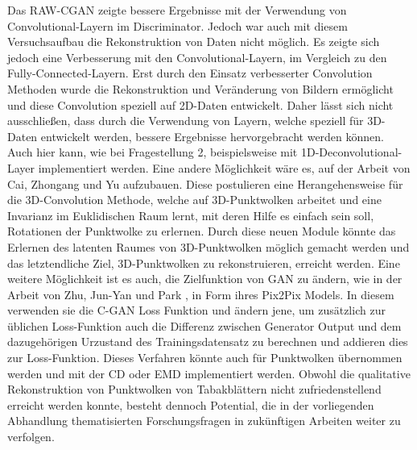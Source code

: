 \documentclass{llncs}
\begin{document}
\pagebreak\linebreak 
Das RAW-CGAN zeigte bessere Ergebnisse mit der Verwendung von Convolutional-Layern im Discriminator. Jedoch war auch mit diesem Versuchsaufbau die Rekonstruktion von Daten nicht möglich. Es zeigte sich jedoch eine Verbesserung mit den Convolutional-Layern, im Vergleich zu den Fully-Connected-Layern. Erst durch den Einsatz verbesserter Convolution Methoden wurde die Rekonstruktion und Veränderung von Bildern ermöglicht  \cite{imagerecon} und diese Convolution speziell auf 2D-Daten entwickelt. Daher lässt sich nicht ausschließen, dass durch die Verwendung von Layern, welche speziell für 3D-Daten entwickelt werden, bessere Ergebnisse hervorgebracht werden können. Auch hier kann, wie bei Fragestellung 2, beispielsweise mit 1D-Deconvolutional-Layer implementiert werden. Eine andere Möglichkeit wäre es, auf der Arbeit von Cai, Zhongang  und Yu \cite{3d-conv} aufzubauen. Diese postulieren eine Herangehensweise für die 3D-Convolution Methode, welche auf 3D-Punktwolken arbeitet und eine Invarianz im Euklidischen Raum lernt, mit deren Hilfe es einfach sein soll, Rotationen der Punktwolke zu erlernen. Durch diese neuen Module könnte das Erlernen des latenten Raumes von 3D-Punktwolken möglich gemacht werden und das letztendliche Ziel, 3D-Punktwolken zu rekonstruieren, erreicht werden.  Eine weitere Möglichkeit ist es auch, die Zielfunktion von GAN zu ändern, wie in der Arbeit von Zhu, Jun-Yan und Park \cite{pix2pix}, in Form ihres Pix2Pix Models. In diesem verwenden sie die C-GAN Loss Funktion und ändern jene, um zusätzlich zur üblichen Loss-Funktion auch die Differenz zwischen Generator Output und dem dazugehörigen Urzustand des Trainingsdatensatz zu berechnen und addieren dies zur Loss-Funktion. Dieses Verfahren könnte auch für Punktwolken übernommen werden und mit der CD oder EMD implementiert werden. Obwohl die qualitative Rekonstruktion von Punktwolken von Tabakblättern nicht zufriedenstellend erreicht werden konnte, besteht dennoch Potential, die in der vorliegenden Abhandlung thematisierten Forschungsfragen in zukünftigen Arbeiten weiter zu verfolgen.
\newpage
\listoffigures
\newpage
\end{document}
